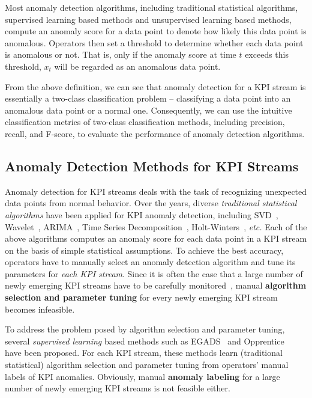  Most anomaly detection algorithms, including traditional statistical algorithms, supervised learning based methods and unsupervised learning based methods, compute an anomaly score for a data point to denote how likely this data point is anomalous.
 Operators then set a threshold to determine whether each data point is anomalous or not. 
 That is, only if the anomaly score at time $t$ exceeds this threshold, $x_t$ will be regarded as an anomalous data point.

From the above definition, we can see that anomaly detection for a KPI stream is essentially a two-class classification problem -- classifying a data point into an anomalous data point or a normal one. 
Consequently, we can use the intuitive classification metrics of two-class classification methods, including precision, recall, and F-score, to evaluate the performance of anomaly detection algorithms.

\subsection{Anomaly Detection Methods for KPI Streams}
\label{sec:related}
Anomaly detection for KPI streams deals with the task of recognizing unexpected data points from normal behavior.
Over the years, diverse \emph{traditional statistical algorithms} have been applied for KPI anomaly detection, including SVD~\cite{Mahimkar:2011:RDM:2079296.2079309}, Wavelet~\cite{barford2002signal}, ARIMA~\cite{Zhang:2005:NA:1251086.1251116}, Time Series Decomposition~\cite{chen2013provider}, Holt-Winters~\cite{yan2012argus}, \emph{etc.}
Each of the above algorithms computes an anomaly score for each data point in a KPI stream on the basis of simple statistical assumptions. 
To achieve the best accuracy, operators have to manually select an anomaly detection algorithm and tune its parameters for \emph{each KPI stream}.
Since it is often the case that a large number of newly emerging KPI streams have to be carefully monitored~\cite{zhang2016funnel}, manual \textbf{algorithm selection and parameter tuning} for every newly emerging KPI stream becomes infeasible.

To address the problem posed by algorithm selection and parameter tuning, several \emph{supervised learning} based methods such as EGADS~\cite{egads} and Opprentice~\cite{liu2015opprentice} have been proposed.
For each KPI stream, these methods learn (traditional statistical) algorithm selection and parameter tuning from operators' manual labels of KPI anomalies.
Obviously, manual \textbf{anomaly labeling} for a large number of newly emerging KPI streams is not feasible either.

